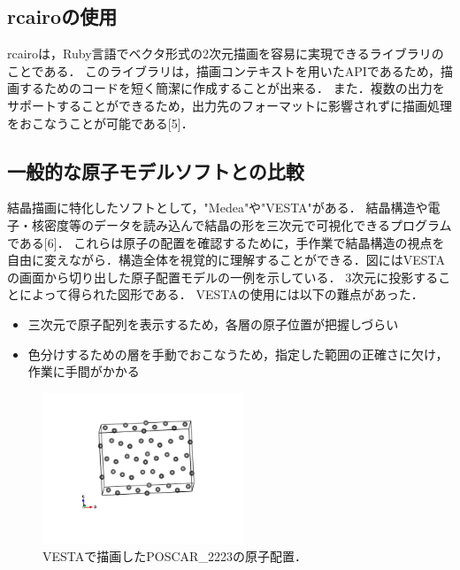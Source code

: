 \subsection{rcairoの使用}
rcairoは，Ruby言語でベクタ形式の2次元描画を容易に実現できるライブラリのことである．
このライブラリは，描画コンテキストを用いたAPIであるため，描画するためのコードを短く簡潔に作成することが出来る．
また．複数の出力をサポートすることができるため，出力先のフォーマットに影響されずに描画処理をおこなうことが可能である[5]．

\subsection{一般的な原子モデルソフトとの比較}
結晶描画に特化したソフトとして，"Medea"や"VESTA"がある．
結晶構造や電子・核密度等のデータを読み込んで結晶の形を三次元で可視化できるプログラムである[6]．
これらは原子の配置を確認するために，手作業で結晶構造の視点を自由に変えながら．構造全体を視覚的に理解することができる．図にはVESTAの画面から切り出した原子配置モデルの一例を示している．
3次元に投影することによって得られた図形である．
VESTAの使用には以下の難点があった．

\begin{itemize}
\item 三次元で原子配列を表示するため，各層の原子位置が把握しづらい
\item 色分けするための層を手動でおこなうため，指定した範囲の正確さに欠け，作業に手間がかかる
\end{itemize}
\begin{figure}[htbp]\begin{center}
\includegraphics[width=6cm,bb=0 0 442 500]{../figs/./boundary_narita.006.jpg}
\caption{VESTAで描画したPOSCAR\_2223の原子配置．}
\label{default}\end{center}\end{figure}
